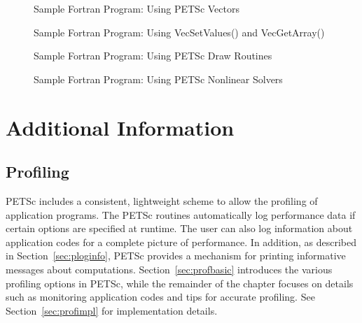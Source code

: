 \begin{figure}[H]
{\small
{}
}
\caption{Sample Fortran Program:  Using PETSc Vectors}
\label{fig:vec-Fortran}
\end{figure}

\begin{figure}[H]
{\small
{}
}
\caption{Sample Fortran Program:  Using VecSetValues() and VecGetArray()}
\label{fig:vec2-Fortran}
\end{figure}

\begin{figure}[H]
{\small
{}
}
\caption{Sample Fortran Program:  Using PETSc Draw Routines}
\label{fig:draw-Fortran}
\end{figure}

\begin{figure}[H]
{\small
{}
}
\caption{Sample Fortran Program:  Using PETSc Nonlinear Solvers}
\label{fig:SNES-Fortran}
\end{figure}

\part{Additional Information}
\label{part:usefulstuff}

\chapter{Profiling} 
\label{ch:profiling} 

PETSc includes a consistent, lightweight scheme to allow the profiling
of application programs.  The PETSc routines automatically log
performance data if certain options are specified at runtime.  The
user can also log information about application codes for a complete
picture of performance.  In addition, as described in
Section~\ref{sec:ploginfo}, PETSc provides a mechanism for printing
informative messages about computations.  Section~\ref{sec:profbasic}
introduces the various profiling options in PETSc, while the
remainder of the chapter focuses on details such as monitoring
application codes and tips for accurate profiling.  See
Section~\ref{sec:profimpl} for implementation details.

